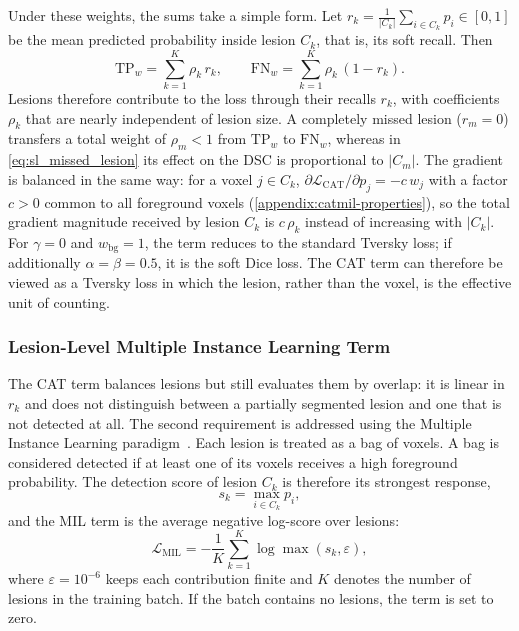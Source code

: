 Under these weights, the sums take a simple form. Let
$r_k = \frac{1}{|C_k|}\sum_{i \in C_k} p_i \in [0,1]$ be the mean predicted
probability inside lesion $C_k$, that is, its soft recall. Then
\begin{equation}
\mathrm{TP}_{w} = \sum_{k=1}^{K} \rho_k\, r_k,
\qquad
\mathrm{FN}_{w} = \sum_{k=1}^{K} \rho_k\, (1-r_k) .
\label{eq:sl_cat_lesion_form}
\end{equation}
Lesions therefore contribute to the loss through their recalls $r_k$, with
coefficients $\rho_k$ that are nearly independent of lesion size. A
completely missed lesion ($r_m=0$) transfers a total weight of
$\rho_m < 1$ from $\mathrm{TP}_{w}$ to $\mathrm{FN}_{w}$, whereas in
\cref{eq:sl_missed_lesion} its effect on the DSC is proportional to
$|C_m|$. The gradient is balanced in the same way: for a voxel
$j \in C_k$,
$\partial \mathcal{L}_{\mathrm{CAT}} / \partial p_j = -c\, w_j$ with a factor
$c>0$ common to all foreground voxels (\cref{appendix:catmil-properties}),
so the total gradient magnitude received by lesion $C_k$ is $c\,\rho_k$
instead of increasing with $|C_k|$. For $\gamma=0$ and $w_{\mathrm{bg}}=1$,
the term reduces to the standard Tversky loss; if additionally
$\alpha=\beta=0.5$, it is the soft Dice loss. The CAT term can therefore be
viewed as a Tversky loss in which the lesion, rather than the voxel, is the
effective unit of counting.

\subsubsection{Lesion-Level Multiple Instance Learning Term}

The CAT term balances lesions but still evaluates them by overlap: it is
linear in $r_k$ and does not distinguish between a partially segmented
lesion and one that is not detected at all. The second requirement is
addressed using the Multiple Instance Learning
paradigm~\cite{ilse_attention-based_2018}. Each lesion is treated as a bag
of voxels. A bag is considered detected if at least one of its voxels
receives a high foreground probability. The detection score of lesion
$C_k$ is therefore its strongest response,
\begin{equation}
s_k = \max_{i \in C_k} p_i ,
\end{equation}
and the MIL term is the average negative log-score over lesions:
\begin{equation}
\mathcal{L}_{\mathrm{MIL}}
=
-\frac{1}{K} \sum_{k=1}^{K} \log \max(s_k, \varepsilon) ,
\label{eq:sl_mil_loss}
\end{equation}
where $\varepsilon=10^{-6}$ keeps each contribution finite and $K$ denotes
the number of lesions in the training batch. If the batch contains no
lesions, the term is set to zero.

